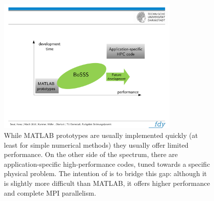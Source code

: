\documentclass[a4paper,10pt]{report} %
\begin{document}
\begin{figure}[!h]
\begin{center}
\includegraphics[width=0.8\textwidth]{figures/BoSSS-philosophy-2}
\end{center}
\caption{
While MATLAB prototypes are usually implemented quickly (at least for simple numerical methods)
they usually offer limited performance.
On the other side of the spectrum, there are application-specific high-performance codes,
tuned towards a specific physical problem.
The intention of \BoSSS{} is to bridge this gap: although it is slightly more difficult
than MATLAB,
it offers higher performance and complete MPI parallelism.
}
\label{fig:BoSSS-Philosophy-2}
\end{figure}
\end{document}
